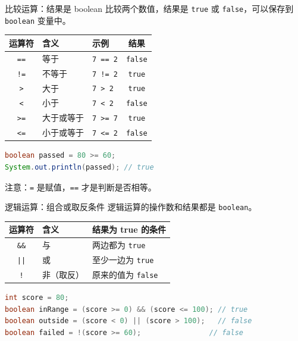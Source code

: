 \documentclass[aspectratio=169]{beamer}
\begin{document}
\begin{frame}[fragile]{比较运算：结果是 boolean}
  比较两个数值，结果是 \texttt{true} 或 \texttt{false}，可以保存到 \texttt{boolean} 变量中。
  \begin{center}
    \renewcommand{\arraystretch}{1.05}
    \begin{tabular}{cllc}
      \textbf{运算符} & \textbf{含义} & \textbf{示例} & \textbf{结果} \\
      \hline
      \texttt{==} & 等于 & \texttt{7 == 2} & \texttt{false} \\
      \texttt{!=} & 不等于 & \texttt{7 != 2} & \texttt{true} \\
      \texttt{>} & 大于 & \texttt{7 > 2} & \texttt{true} \\
      \texttt{<} & 小于 & \texttt{7 < 2} & \texttt{false} \\
      \texttt{>=} & 大于或等于 & \texttt{7 >= 7} & \texttt{true} \\
      \texttt{<=} & 小于或等于 & \texttt{7 <= 2} & \texttt{false} \\
    \end{tabular}
  \end{center}
  \begin{lstlisting}[language=Java]
boolean passed = 80 >= 60;
System.out.println(passed); // true
  \end{lstlisting}
  注意：\texttt{=} 是赋值，\texttt{==} 才是判断是否相等。
\end{frame}

\begin{frame}[fragile]{逻辑运算：组合或取反条件}
  逻辑运算的操作数和结果都是 \texttt{boolean}。
  \begin{center}
    \renewcommand{\arraystretch}{1.25}
    \begin{tabular}{cll}
      \textbf{运算符} & \textbf{含义} & \textbf{结果为 true 的条件} \\
      \hline
      \texttt{\&\&} & 与 & 两边都为 \texttt{true} \\
      \texttt{||} & 或 & 至少一边为 \texttt{true} \\
      \texttt{!} & 非（取反） & 原来的值为 \texttt{false} \\
    \end{tabular}
  \end{center}
  \begin{lstlisting}[language=Java]
int score = 80;
boolean inRange = (score >= 0) && (score <= 100); // true
boolean outside = (score < 0) || (score > 100);   // false
boolean failed = !(score >= 60);                // false
  \end{lstlisting}
\end{frame}
\end{document}
